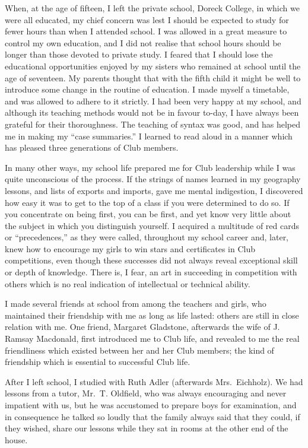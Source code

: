 When, at the age of fifteen, I left the private school,
Doreck College, in which we were all educated, my chief
concern was lest I should be expected to study for fewer
hours than when I attended school. I was allowed in a
great measure to control my own education, and I did
not realise that school hours should be longer than those
devoted to private study. I feared that I should lose the
educational opportunities enjoyed by my sisters who
remained at school until the age of seventeen. My parents
thought that with the fifth child it might be well to introduce
some change in the routine of education. I made
myself a timetable, and was allowed to adhere to it
strictly. I had been very happy at my school, and although
its teaching methods would not be in favour to-day, I
have always been grateful for their thoroughness. The
teaching of syntax was good, and has helped me in making
my “case summaries.” I learned to read aloud in a
manner which has pleased three generations of Club
members.

In many other ways, my school life prepared me for
Club leadership while I was quite unconscious of
the process. If the strings of names learned in
my geography lessons, and lists of exports and imports,
gave me mental indigestion, I discovered how easy it was
to get to the top of a class if you were determined to do so.
If you concentrate on being first, you can be first, and
yet know very little about the subject in which you distinguish
yourself. I acquired a multitude of red cards or
“precedences,” as they were called, throughout my school
career and, later, knew how to encourage my girls to win
stars and certificates in Club competitions, even though
these successes did not always reveal exceptional skill
or depth of knowledge. There is, I fear, an art in
succeeding in competition with others which is no real
indication of intellectual or technical ability.

I made several friends at school from among the
teachers and girls, who maintained their friendship with
me as long as life lasted: others are still in close relation
with me. One friend, Margaret Gladstone, afterwards
the wife of J. Ramsay Macdonald, first introduced me to
Club life, and revealed to me the real friendliness which
existed between her and her Club members; the kind of
friendship which is essential to successful Club life.

After I left school, I studied with Ruth Adler (afterwards
Mrs.\ Eichholz). We had lessons from a tutor,
Mr.\ T. Oldfield, who was always encouraging and never impatient
with us, but he was accustomed to prepare boys
for examination, and in consequence he talked so loudly
that the family always said that they could, if they
wished, share our lessons while they sat in rooms at the
other end of the house.

